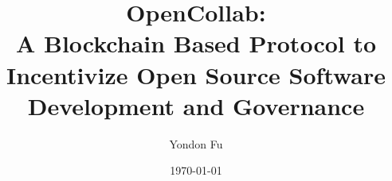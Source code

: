 \documentclass{article}
\begin{document}
\title{
  {OpenCollab:}\\
  {A Blockchain Based Protocol to Incentivize Open Source Software Development and Governance}
}
\author{Yondon Fu}
\date{\today}

\maketitle







\printbibliography
\end{document}
